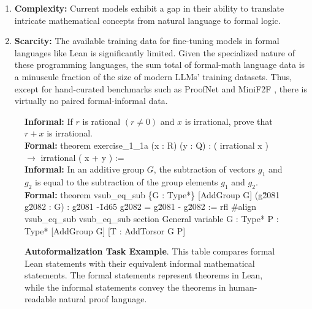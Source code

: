 \documentclass{article} %
\begin{document}
\begin{enumerate}
    \item \textbf{Complexity: }Current models exhibit a gap in their ability to translate intricate mathematical concepts from natural language to formal logic.

    \item \textbf{Scarcity: }The available training data for fine-tuning models in formal languages like Lean is significantly limited. Given the specialized nature of these programming languages, the sum total of formal-math language data is a minuscule fraction of the size of modern LLMs' training datasets. Thus, except for hand-curated benchmarks such as ProofNet \citep{azerbayev2023proofnet} and MiniF2F \cite{minif2f}, there is virtually no paired formal-informal data.
\end{enumerate}

\begin{figure}[ht]
\centering
\begin{tcolorbox}[colframe=black!75!white, colback=white, boxrule=0.5mm, width=\linewidth, title={Example of Formal and Informal Statements}]
    \begin{minipage}{\linewidth}
    \textbf{Informal:} If $r$ is rational $(r \neq 0)$ and $x$ is irrational, prove that $r + x$ is irrational. \\
    \textbf{Formal:} theorem exercise\_1\_1a (x : R) (y : Q) : ( irrational x ) $\rightarrow$ irrational ( x + y ) := \\
    
    
    \textbf{Informal:} In an additive group $G$, the subtraction of vectors $g_1$ and $g_2$ is equal to the subtraction of the group elements $g_1$ and $g_2$. \\
    \textbf{Formal:} theorem vsub\_eq\_sub \{G : Type*\} [AddGroup G] (g\u2081 g\u2082 : G) : g\u2081 -\u1d65 g\u2082 = g\u2081 - g\u2082 :=   rfl \#align vsub\_eq\_sub vsub\_eq\_sub section General variable {G : Type*} {P : Type*} [AddGroup G] [T : AddTorsor G P]
    \end{minipage}
\end{tcolorbox}
\caption{\textbf{Autoformalization Task Example}. This table compares formal Lean statements with their equivalent informal mathematical statements. The formal statements represent theorems in Lean, while the informal statements convey the theorems in human-readable natural proof language.}

\label{fig:formal_informal_example}
\end{figure}
\end{document}
